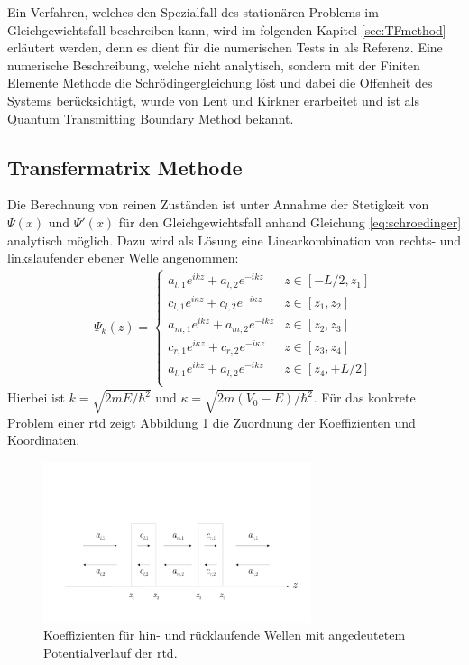 Ein Verfahren, welches den Spezialfall des stationären Problems im Gleichgewichtsfall beschreiben kann, wird im folgenden Kapitel \ref{sec:TFmethod} erläutert werden, denn es dient für die numerischen Tests in  als Referenz. Eine numerische Beschreibung, welche nicht analytisch, sondern mit der Finiten Elemente Methode die Schrödingergleichung löst und dabei die Offenheit des Systems berücksichtigt, wurde von Lent und Kirkner \cite{qtbm} erarbeitet und ist als Quantum Transmitting Boundary Method bekannt.

\subsection{Transfermatrix Methode}
\label{sec:TFmethod}
Die Berechnung von reinen Zuständen ist unter Annahme der Stetigkeit von $\Psi(x)$ und $\Psi'(x)$ für den Gleichgewichtsfall anhand Gleichung \eqref{eq:schroedinger} analytisch möglich. Dazu wird als Lösung eine Linearkombination von rechts- und linkslaufender ebener Welle angenommen:
\begin{equation}
  \begin{aligned}
    \Psi_k(z)=
    \begin{cases}
    a_{l,1}e^{ikz} + a_{l,2}e^{-ikz}              & z\in[-L/2,z_1] \\
    c_{l,1}e^{i\kappa z} + c_{l,2}e^{-i\kappa z}  & z\in[z_1, z_2] \\
    a_{m,1}e^{ikz} + a_{m,2}e^{-ikz}              & z\in[z_2,z_3] \\
    c_{r,1}e^{i\kappa z} + c_{r,2}e^{-i\kappa z}  & z\in[z_3, z_4] \\
    a_{l,1}e^{ikz} + a_{l,2}e^{-ikz}              & z\in[z_4, +L/2] \\
    \end{cases}
  \end{aligned}
\end{equation}
Hierbei ist $k=\sqrt{2mE/\hbar^2}$ und $\kappa=\sqrt{2m(V_0-E)/\hbar^2}$.
Für das konkrete Problem einer \ac{rtd} zeigt Abbildung \ref{fig:tf1} die Zuordnung der Koeffizienten und Koordinaten.
\begin{figure}
  \centering
  \includegraphics[width=0.7\textwidth]{files/TF_variables.pdf}
  \caption{Koeffizienten für hin- und rücklaufende Wellen mit angedeutetem Potentialverlauf der \ac{rtd}.}
  \label{fig:tf1}
\end{figure}
